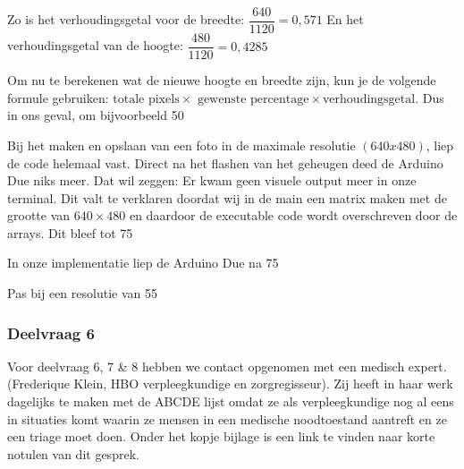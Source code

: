 \documentclass{article}
\begin{document}
Zo is het verhoudingsgetal voor de breedte: ${\dfrac{640}{1120} = 0,571}$
En het verhoudingsgetal van de hoogte: ${\dfrac{480}{1120} = 0,4285}$

Om nu te berekenen wat de nieuwe hoogte en breedte zijn, kun je de volgende formule gebruiken: ${\text{totale pixels} \times \text{ gewenste percentage} \times \text{verhoudingsgetal}}$.
Dus in ons geval, om bijvoorbeeld 50%

Bij het maken en opslaan van een foto in de maximale resolutie ${(640 x 480)}$, liep de code helemaal vast. Direct na het flashen van het geheugen deed de Arduino Due niks meer. Dat wil zeggen: Er kwam geen visuele output meer in onze terminal. Dit valt te verklaren doordat wij in de main een matrix maken met de grootte van ${640 \times 480}$ en daardoor de executable code wordt overschreven door de arrays. 
Dit bleef tot 75%

In onze implementatie liep de Arduino Due na 75%

Pas bij een resolutie van 55%

\subsubsection{Deelvraag 6}Voor deelvraag 6, 7 \& 8 hebben we contact opgenomen met een medisch expert. (Frederique Klein, HBO verpleegkundige en zorgregisseur). Zij heeft in haar werk dagelijks te maken met de ABCDE lijst omdat ze als verpleegkundige nog al eens in situaties komt waarin ze mensen in een medische noodtoestand aantreft en ze een triage moet doen. Onder het kopje bijlage is een link te vinden naar korte notulen van dit gesprek. 
\end{document}
